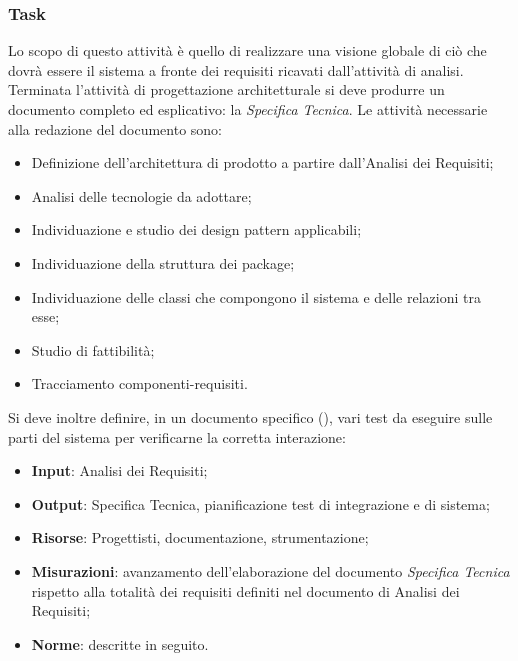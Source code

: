 \subsubsection{Task}
Lo scopo di questo attività è quello di realizzare una visione globale di ciò che dovrà essere il sistema a fronte dei requisiti ricavati dall’attività di analisi.
Terminata l’attività di progettazione architetturale si deve produrre un documento completo ed esplicativo: la \emph{Specifica Tecnica}.
Le attività necessarie alla redazione del documento sono:
\begin{itemize}
\item Definizione dell’architettura di prodotto a partire dall’Analisi dei Requisiti;
\item Analisi delle tecnologie da adottare;
\item Individuazione e studio dei design pattern applicabili;
\item Individuazione della struttura dei package;
\item Individuazione delle classi che compongono il sistema e delle relazioni tra esse;
\item Studio di fattibilità;
\item Tracciamento componenti-requisiti.
\end{itemize}
Si deve inoltre definire, in un documento specifico  (\href{run:../../Esterni/\fPianoDiQualifica}{\fEscapePianoDiQualifica}), vari
test da eseguire sulle parti del sistema per verificarne la corretta interazione:
\begin{itemize}
\item \textbf{Input}: Analisi dei Requisiti;
\item \textbf{Output}: Specifica Tecnica, pianificazione test di integrazione e di sistema;
\item \textbf{Risorse}: Progettisti, documentazione, strumentazione;
\item \textbf{Misurazioni}: avanzamento dell’elaborazione del documento \emph{Specifica Tecnica} rispetto alla totalità dei requisiti definiti nel documento di Analisi dei Requisiti;
\item \textbf{Norme}: descritte in seguito.
\end{itemize}
       
